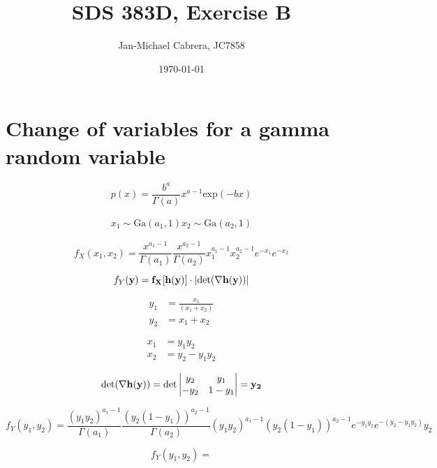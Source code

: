 \documentclass[12pt]{article}%
\begin{document}
      \title{SDS 383D, Exercise B}
      \author{Jan-Michael Cabrera, JC7858}
      \date{\today}
      \maketitle


      \section*{Change of variables for a gamma random variable}

            \begin{equation}\label{eq:gamma}
                  p(x) = \frac{b^a}{\Gamma(a)}x^{a-1} \text{exp}(-bx)
            \end{equation}

            \begin{align}
                  x_1 \sim \text{Ga}(a_1, 1)
                  x_2 \sim \text{Ga}(a_2, 1)
            \end{align}

            \begin{equation}\label{eq:x_joint}
                  f_X(x_1, x_2) = \frac{x^{a_1-1}}{\Gamma(a_1)}\frac{x^{a_2-1}}{\Gamma(a_2)}x_1^{a_1-1} x_2^{a_2-1} e^{-x_1}e^{-x_2}
            \end{equation}

            \begin{equation}\label{eq:change_variables}
                  f_Y(\bf{y}) = f_X[\bf{h(y)}]\cdot|\text{det}(\nabla h(y))|
            \end{equation}

            \begin{align}
                  y_1 &= \frac{x_1}{(x_1+x_2)} \\
                  y_2 &= x_1 + x_2
            \end{align}

            \begin{align}
                  x_1 &= y_1 y_2 \\
                  x_2 &= y_2 - y_1 y_2
            \end{align}

            \begin{equation}
                  \text{det}(\nabla \bf{h(y)}) = \text{det}
                  \begin{vmatrix}
                  y_2 & y_1 \\
                  -y_2 & 1-y_1
                  \end{vmatrix}
                  = y_2
            \end{equation}

            \begin{equation}
                  f_Y(y_1, y_2) = \frac{(y_1 y_2)^{a_1-1}}{\Gamma(a_1)}\frac{(y_2 (1-y_1))^{a_2-1}}{\Gamma(a_2)}(y_1 y_2)^{a_1-1} (y_2 (1-y_1))^{a_2-1} e^{-y_1 y_2}e^{-(y_2 - y_1 y_2)} y_2
            \end{equation}

            \begin{equation}
                  f_Y(y_1, y_2) = 
            \end{equation}
\end{document}
